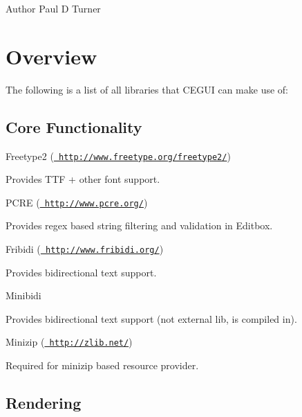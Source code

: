 \begin{DoxyAuthor}{Author}
Paul D Turner
\end{DoxyAuthor}
\hypertarget{dependencies_dependencies_overview}{}\section{Overview}\label{dependencies_dependencies_overview}
The following is a list of all libraries that C\+E\+G\+UI can make use of\+:\hypertarget{dependencies_dependencies_core}{}\subsection{Core Functionality}\label{dependencies_dependencies_core}

\begin{DoxyItemize}
\item Freetype2 (\href{http://www.freetype.org/freetype2/}{\texttt{ http\+://www.\+freetype.\+org/freetype2/}})
\begin{DoxyItemize}
\item Provides T\+TF + other font support.
\end{DoxyItemize}
\item P\+C\+RE (\href{http://www.pcre.org/}{\texttt{ http\+://www.\+pcre.\+org/}})
\begin{DoxyItemize}
\item Provides regex based string filtering and validation in Editbox.
\end{DoxyItemize}
\item Fribidi (\href{http://www.fribidi.org/}{\texttt{ http\+://www.\+fribidi.\+org/}})
\begin{DoxyItemize}
\item Provides bidirectional text support.
\end{DoxyItemize}
\item Minibidi
\begin{DoxyItemize}
\item Provides bidirectional text support (not external lib, is compiled in).
\end{DoxyItemize}
\item Minizip (\href{http://zlib.net/}{\texttt{ http\+://zlib.\+net/}})
\begin{DoxyItemize}
\item Required for minizip based resource provider.
\end{DoxyItemize}
\end{DoxyItemize}\hypertarget{dependencies_dependencies_rendering}{}\subsection{Rendering}\label{dependencies_dependencies_rendering}

